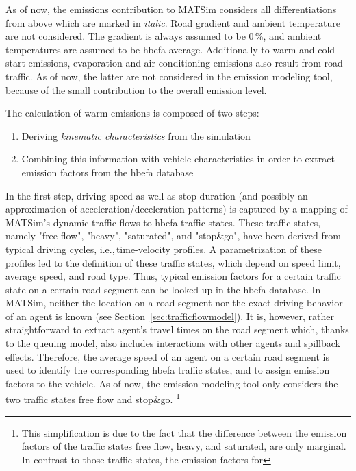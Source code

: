 {As of now, the emissions contribution to MATSim considers all differentiations from above which are marked in \emph{italic}. Road gradient and ambient temperature are not considered. The gradient is always assumed to be 0\,\%, and ambient temperatures are assumed to be \gls{hbefa} average.
%
Additionally to warm and cold-start emissions, evaporation and air conditioning emissions also result from road traffic. As of now, the latter are not considered in the emission modeling tool, because of the small contribution to the overall emission level.

The calculation of warm emissions is composed of two steps:
%
\begin{enumerate}
 \item Deriving \emph{kinematic characteristics} from the simulation
 \item Combining this information with vehicle characteristics in order to 
 extract emission factors from the \gls{hbefa} database
\end{enumerate}
%
In the first step, driving speed as well as stop duration (and possibly an 
approximation of acceleration/deceleration patterns) is captured by a 
mapping of MATSim's dynamic traffic flows to \gls{hbefa} traffic states. 
These traffic states, namely "free flow", "heavy", "saturated", and "stop\&go", 
have been derived from typical driving cycles, i.e.,\,time-velocity profiles. 
A parametrization of these profiles led to the definition of these traffic 
states, which depend on speed limit, average speed, and road type. Thus, 
typical emission factors for a certain traffic state on a certain road segment 
can be looked up in the \gls{hbefa} database.
%
In MATSim, neither the location on a road segment nor the exact driving behavior of an agent is known (see Section~\ref{sec:trafficflowmodel}).
%
%
It is, however, rather straightforward to extract agent's travel times on the road segment which, thanks to the queuing model, also includes interactions with other agents and spillback effects.
%
Therefore, the average speed of an agent on a certain road segment is used to 
identify the corresponding \gls{hbefa} traffic states, and to assign emission 
factors to the vehicle. As of now, the emission modeling tool only considers 
the two traffic states free flow and stop\&go.%
% 
\footnote{
%
This simplification is due to the fact that the difference between the 
emission factors of the traffic states free flow, heavy, and saturated, are 
only marginal. In contrast to those traffic states, the emission factors for 
}}
